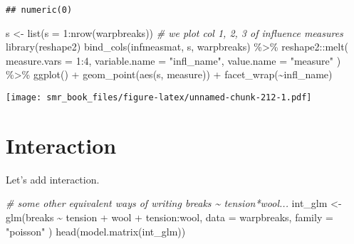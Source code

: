 \documentclass[
  oneside]{book}
\newenvironment{Shaded}{\begin{snugshade}}{\end{snugshade}}
\newcommand{\AttributeTok}[1]{\textcolor[rgb]{0.77,0.63,0.00}{#1}}
\newcommand{\CommentTok}[1]{\textcolor[rgb]{0.56,0.35,0.01}{\textit{#1}}}
\newcommand{\DecValTok}[1]{\textcolor[rgb]{0.00,0.00,0.81}{#1}}
\newcommand{\FunctionTok}[1]{\textcolor[rgb]{0.00,0.00,0.00}{#1}}
\newcommand{\NormalTok}[1]{#1}
\newcommand{\OtherTok}[1]{\textcolor[rgb]{0.56,0.35,0.01}{#1}}
\newcommand{\SpecialCharTok}[1]{\textcolor[rgb]{0.00,0.00,0.00}{#1}}
\newcommand{\StringTok}[1]{\textcolor[rgb]{0.31,0.60,0.02}{#1}}
\begin{document}
\begin{verbatim}
## numeric(0)
\end{verbatim}

\begin{Shaded}
\begin{Highlighting}[]
\NormalTok{s }\OtherTok{\textless{}{-}} \FunctionTok{list}\NormalTok{(}\AttributeTok{s =} \DecValTok{1}\SpecialCharTok{:}\FunctionTok{nrow}\NormalTok{(warpbreaks))}
\CommentTok{\# we plot col 1, 2, 3 of influence measures}
\FunctionTok{library}\NormalTok{(reshape2)}
\FunctionTok{bind\_cols}\NormalTok{(infmeasmat, s, warpbreaks) }\SpecialCharTok{\%\textgreater{}\%}
\NormalTok{  reshape2}\SpecialCharTok{::}\FunctionTok{melt}\NormalTok{(}
    \AttributeTok{measure.vars =} \DecValTok{1}\SpecialCharTok{:}\DecValTok{4}\NormalTok{,}
    \AttributeTok{variable.name =} \StringTok{"infl\_name"}\NormalTok{,}
    \AttributeTok{value.name =} \StringTok{"measure"}
\NormalTok{  ) }\SpecialCharTok{\%\textgreater{}\%}
  \FunctionTok{ggplot}\NormalTok{() }\SpecialCharTok{+}
  \FunctionTok{geom\_point}\NormalTok{(}\FunctionTok{aes}\NormalTok{(s, measure)) }\SpecialCharTok{+}
  \FunctionTok{facet\_wrap}\NormalTok{(}\SpecialCharTok{\textasciitilde{}}\NormalTok{infl\_name)}
\end{Highlighting}
\end{Shaded}

\texttt{[image: smr\_book\_files/figure-latex/unnamed-chunk-212-1.pdf]}

\hypertarget{interaction}{%
\section{Interaction}\label{interaction}}

Let's add interaction.

\begin{Shaded}
\begin{Highlighting}[]
\CommentTok{\# some other equivalent ways of writing breaks \textasciitilde{} tension*wool...}
\NormalTok{int\_glm }\OtherTok{\textless{}{-}} \FunctionTok{glm}\NormalTok{(breaks }\SpecialCharTok{\textasciitilde{}}\NormalTok{ tension }\SpecialCharTok{+}\NormalTok{ wool }\SpecialCharTok{+}\NormalTok{ tension}\SpecialCharTok{:}\NormalTok{wool,}
  \AttributeTok{data =}\NormalTok{ warpbreaks, }\AttributeTok{family =} \StringTok{"poisson"}
\NormalTok{)}
\FunctionTok{head}\NormalTok{(}\FunctionTok{model.matrix}\NormalTok{(int\_glm))}
\end{Highlighting}
\end{Shaded}
\end{document}
